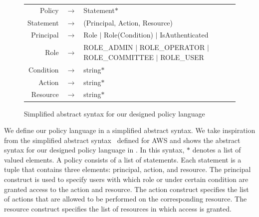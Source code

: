 \begin{figure} [btp]
  \small
  \begin{tabular}{rcp{5cm}}
    Policy \hspace*{-3ex}    & $\rightarrow$ & \hspace*{-3ex} Statement$*$                                                      \\
    Statement \hspace*{-3ex} & $\rightarrow$ & \hspace*{-3ex} (Principal, Action, Resource)                                     \\
    Principal \hspace*{-3ex} & $\rightarrow$ & \hspace*{-3ex} Role $|$ Role(Condition) $|$ IsAuthenticated                      \\
    Role \hspace*{-3ex}      & $\rightarrow$ & \hspace*{-3ex} ROLE\_ADMIN $|$ ROLE\_OPERATOR $|$ ROLE\_COMMITTEE $|$ ROLE\_USER \\
    Condition \hspace*{-3ex} & $\rightarrow$ & \hspace*{-3ex} string$*$                                                         \\
    Action \hspace*{-3ex}    & $\rightarrow$ & \hspace*{-3ex} string$*$                                                         \\
    Resource \hspace*{-3ex}  & $\rightarrow$ & \hspace*{-3ex} string$*$                                                         \\
  \end{tabular}
  \caption{Simplified abstract syntax for our designed policy language}
  \label{fig:dsl}
\end{figure}

We define our policy language in a simplified abstract syntax.
%
We take inspiration from the simplified abstract
syntax~\cite{Backes+etal:2018:policy} defined for AWS and shows the abstract
syntax for our designed policy language in .
%
In this syntax, $*$ denotes a list of valued elements.
%
A policy consists of a list of statements.
%
Each statement is a tuple that contains three elements: principal, action, and
resource.
%
The principal construct is used to specify users with which role or under
certain condition are granted access to the action and resource.
%
The action construct specifies the list of actions that are allowed to be
performed on the corresponding resource.
%
The resource construct specifies the list of resources in which access is
granted.

